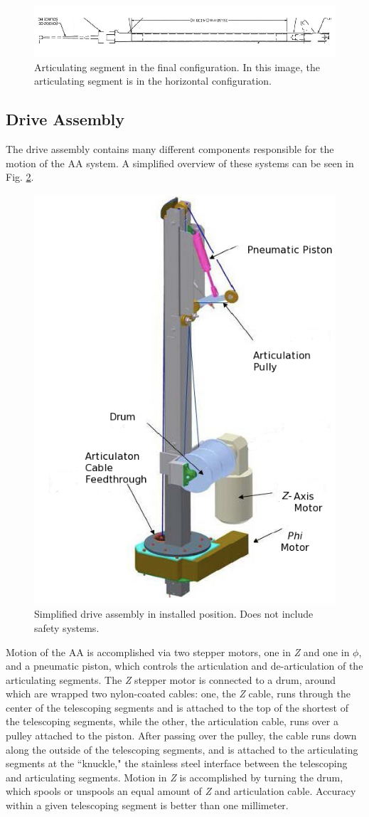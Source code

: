 \begin{figure}
\includegraphics[width = .75 \textwidth]{AA/Articulating_Segment.jpg}
\caption{Articulating segment in the final configuration. In this image, the articulating segment is in the horizontal configuration.}
\label{Articulating Segment}
\end{figure}


\subsection{Drive Assembly}

\label{sec: Motor Assembly}
	The drive assembly contains many different components responsible for the motion of the AA system. A simplified overview of these systems can be seen in Fig. \ref{Drive_Assembly}.
	
	\begin{figure}
	\includegraphics[width = .5 \textwidth]{AA/Drive_Assembly_Edit.jpg}
	\caption{Simplified drive assembly in installed position. Does not include safety systems.}
	\label{Drive_Assembly}
	\end{figure}
	

	Motion of the AA is accomplished via two stepper motors, one in \emph{Z} and one in $\phi$, and a pneumatic piston, which controls the articulation and de-articulation of the articulating segments. The \emph{Z} stepper motor is connected to a drum, around which are wrapped two nylon-coated cables: one, the \emph{Z} cable, runs through the center of the telescoping segments and is attached to the top of the shortest of the telescoping segments, while the other, the articulation cable, runs over a pulley attached to the piston. After passing over the pulley, the cable runs down along the outside of the telescoping segments, and is attached to the articulating segments at the ``knuckle," the stainless steel interface between the telescoping and articulating segments. Motion in \emph{Z} is accomplished by turning the drum, which spools or unspools an equal amount of \emph{Z} and articulation cable. Accuracy within a given telescoping segment is better than one millimeter.
	
